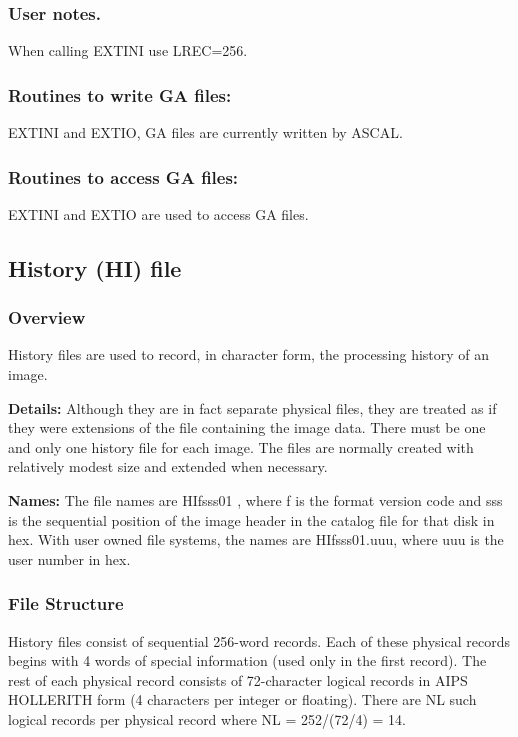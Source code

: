 \subsubsection{User notes.}
 
     When calling EXTINI use LREC=256.
 
 
\subsubsection{ Routines to write GA files:}
     EXTINI and EXTIO,  GA files are currently written by ASCAL.
 
 
\subsubsection{ Routines to access GA files:}
 EXTINI and EXTIO are used to access GA files.
\subsection{History (HI) file}
\subsubsection{Overview}


  History files are used to record, in character form, the
processing history of an image.

{\bf Details:}  Although they are in fact separate physical files, they are
treated as if they were extensions of the file containing the image
data.  There must be one and only one history file for each image.  The
files are normally created with relatively modest size and extended
when necessary.

{\bf Names:}  The file names are HIfsss01 , where f is the format version
code and sss is the sequential position of the image header in the
catalog file for that disk in hex.  With user owned file systems,
the names are HIfsss01.uuu, where uuu is the user number in hex.


\subsubsection{File Structure}


     History files consist of sequential 256-word records.  Each of
these physical records begins with 4 words of special information (used
only in the first record).  The rest of each physical record consists
of 72-character logical records in AIPS HOLLERITH form (4 characters
per integer or floating).  There are NL such logical records per
physical record where NL = 252/(72/4) = 14.

